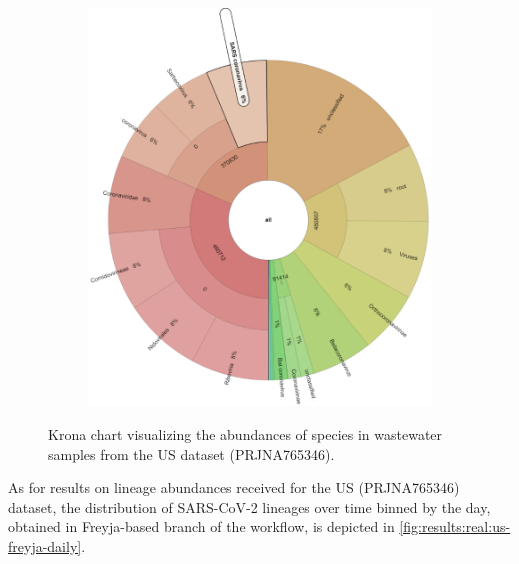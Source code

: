 \begin{figure}[H]
\begin{subfigure}[b]{0.3\textwidth}
        \includegraphics[width=1\textwidth]{figures/results/real/krona/krona-us-sSRR20997582.png}
        \label{fig:results:real:krona-us-c}
        \end{subfigure}
        \caption{Krona chart visualizing the abundances of species in wastewater samples from the US dataset (PRJNA765346).}
    \end{figure}
    
    As for results on lineage abundances received for the US (PRJNA765346) dataset, the distribution of SARS-CoV-2 lineages over time binned by the day, obtained in Freyja-based branch of the workflow, is depicted in \cref{fig:results:real:us-freyja-daily}.
    
